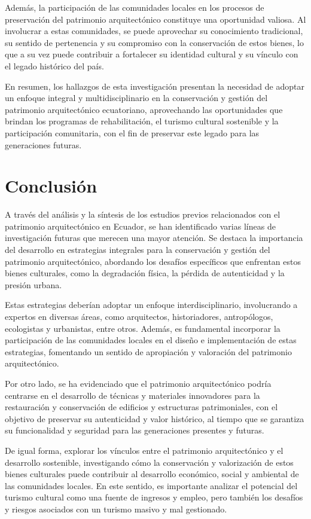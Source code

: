 \documentclass[journal,article,submit,pdftex,moreauthors]{Definitions/mdpi}
\begin{document}
Además, la participación de las comunidades locales en los procesos de preservación del patrimonio arquitectónico constituye una oportunidad valiosa. Al involucrar a estas comunidades, se puede aprovechar su conocimiento tradicional, su sentido de pertenencia y su compromiso con la conservación de estos bienes, lo que a su vez puede contribuir a fortalecer su identidad cultural y su vínculo con el legado histórico del país.

En resumen, los hallazgos de esta investigación presentan la necesidad de adoptar un enfoque integral y multidisciplinario en la conservación y gestión del patrimonio arquitectónico ecuatoriano, aprovechando las oportunidades que brindan los programas de rehabilitación, el turismo cultural sostenible y la participación comunitaria, con el fin de preservar este legado para las generaciones futuras.
\section{ Conclusión}
A través del análisis y la síntesis de los estudios previos relacionados con el patrimonio arquitectónico en Ecuador, se han identificado varias líneas de investigación futuras que merecen una mayor atención. Se destaca la importancia del desarrollo en estrategias integrales para la conservación y gestión del patrimonio arquitectónico, abordando los desafíos específicos que enfrentan estos bienes culturales, como la degradación física, la pérdida de autenticidad y la presión urbana.

Estas estrategias deberían adoptar un enfoque interdisciplinario, involucrando a expertos en diversas áreas, como arquitectos, historiadores, antropólogos, ecologistas y urbanistas, entre otros. Además, es fundamental incorporar la participación de las comunidades locales en el diseño e implementación de estas estrategias, fomentando un sentido de apropiación y valoración del patrimonio arquitectónico.

Por otro lado, se ha evidenciado que el patrimonio arquitectónico podría centrarse en el desarrollo de técnicas y materiales innovadores para la restauración y conservación de edificios y estructuras patrimoniales, con el objetivo de preservar su autenticidad y valor histórico, al tiempo que se garantiza su funcionalidad y seguridad para las generaciones presentes y futuras.

De igual forma, explorar los vínculos entre el patrimonio arquitectónico y el desarrollo sostenible, investigando cómo la conservación y valorización de estos bienes culturales puede contribuir al desarrollo económico, social y ambiental de las comunidades locales. En este sentido, es importante analizar el potencial del turismo cultural como una fuente de ingresos y empleo, pero también los desafíos y riesgos asociados con un turismo masivo y mal gestionado.
\end{document}
